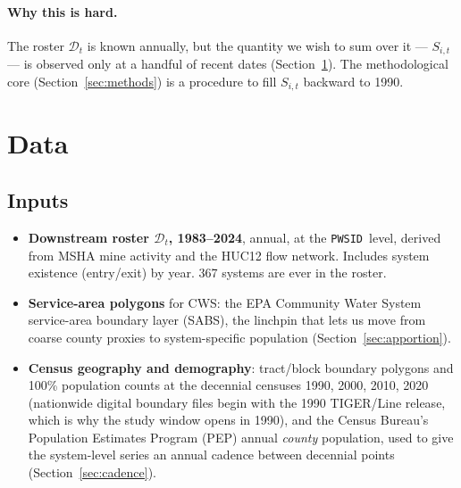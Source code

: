 \documentclass[11pt]{article}
\newcommand{\PWSID}{\texttt{PWSID}}
\begin{document}
\paragraph{Why this is hard.}
The roster $\mathcal{D}_t$ is known annually, but the quantity we wish to sum
over it --- $S_{i,t}$ --- is observed only at a handful of recent dates
(Section~\ref{sec:data}). The methodological core (Section~\ref{sec:methods})
is a procedure to fill $S_{i,t}$ backward to 1990.

\section{Data}
\label{sec:data}

\subsection{Inputs}
\begin{itemize}[leftmargin=2em]
  \item \textbf{Downstream roster $\mathcal{D}_t$, 1983--2024}, annual, at the
    \PWSID\ level, derived from MSHA mine activity and the HUC12 flow network.
    Includes system existence (entry/exit) by year. 367 systems are ever in
    the roster.
  \item \textbf{Service-area polygons} for CWS: the EPA Community Water System
    service-area boundary layer (SABS), the linchpin that lets us move from
    coarse county proxies to system-specific population
    (Section~\ref{sec:apportion}).
  \item \textbf{Census geography and demography}: tract/block boundary
    polygons and 100\% population counts at the decennial censuses 1990,
    2000, 2010, 2020 (nationwide digital boundary files begin with the 1990
    TIGER/Line release, which is why the study window opens in 1990), and the
    Census Bureau's Population Estimates Program (PEP) annual \emph{county}
    population, used to give the system-level series an annual cadence
    between decennial points (Section~\ref{sec:cadence}).
\end{itemize}
\end{document}
